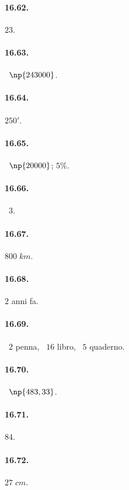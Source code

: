 \begin{multicols}{2}
\paragraph{16.62.}
$23$.

\paragraph{16.63.}
\officialeuro~$\np{243000}$.

\paragraph{16.64.}
$250'$.

\paragraph{16.65.}
\officialeuro~$\np{20000}$; $5\%$.

\paragraph{16.66.}
\officialeuro~$3$.

\paragraph{16.67.}
$800\;\unit{km}$.

\paragraph{16.68.}
$2$ anni fa.

\paragraph{16.69.}
\officialeuro~$2$ penna, \officialeuro~$16$ libro, \officialeuro~$5$ quaderno.

\paragraph{16.70.}
\officialeuro~$\np{483,33}$.

\paragraph{16.71.}
$84$.

\paragraph{16.72.}
$27\;\unit{cm}$.


\end{multicols}
